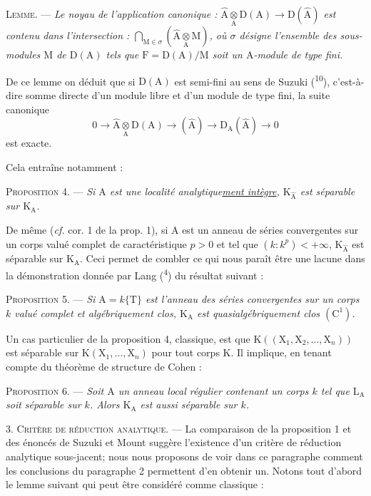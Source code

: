 \textsc{Lemme.} --- \textit{Le noyau de l’application canonique : $\widehat{\mathrm A}\underset{\mathrm A}{\otimes}\mathrm D(\mathrm A)\to\mathrm D(\widehat{\mathrm A})$ est contenu dans l’intersection : $\displaystyle\bigcap_{\mathrm M\in\sigma}\left(\widehat{\mathrm A}\underset{\mathrm A}{\otimes}\mathrm M\right)$, où $\sigma$ désigne l’ensemble des sous-modules $\mathrm M$ de $\mathrm D(\mathrm A)$ tels que $\mathrm F=\mathrm D(\mathrm A)/\mathrm M$ soit un $\mathrm A$-module de type fini.}

De ce lemme on déduit que si $\mathrm D(\mathrm A)$ est semi-fini au sens de Suzuki (\textsuperscript{10}), c’est-à-dire somme directe d’un module libre et d’un module de type fini, la suite canonique
\[
0\to\widehat{\mathrm A}\underset{\mathrm A}{\otimes}\mathrm D(\mathrm A)\to(\widehat{\mathrm A})\to\mathrm D_{\mathrm A}(\widehat{\mathrm A})\to0
\]
est exacte.

Cela entraîne notamment :

\textsc{Proposition 4.} --- \textit{Si $\mathrm A$ est une localité analytique\uline{ment intègre}, $\mathrm K_{\widehat{\mathrm A}}$ est séparable sur $\mathrm K_{\mathrm A}$.}

De même (\textit{cf.} cor. 1 de la prop. 1), si $\mathrm A$ est un anneau de séries convergentes sur un corps valué complet de caractéristique $p>0$ et tel que $(k:k^p)<+\infty$, $\mathrm K_{\widehat{\mathrm A}}$ est séparable sur $\mathrm K_{\mathrm A}$. Ceci permet de combler ce qui nous paraît être une lacune dans la démonstration donnée par Lang (\textsuperscript{4}) du résultat suivant :
\margin{\handwritten{$\left.\rule{0pt}{8em}\right]$ connu}}

\textsc{Proposition 5.} --- \textit{Si $\mathrm A=k\{\mathrm T\}$ est l’anneau des séries convergentes sur un corps $k$ valué complet et algébriquement clos, $\mathrm K_{\mathrm A}$ est quasialgébriquement clos $(\mathrm C^1)$.}

Un cas particulier de la proposition 4, classique, est que $\mathrm K((\mathrm X_1,\mathrm X_2,\ldots,\mathrm X_n))$ est séparable sur $\mathrm K(\mathrm X_1,\ldots,\mathrm X_n)$ pour tout corps $\mathrm K$. Il implique, en tenant compte du théorème de structure de Cohen :

\textsc{Proposition 6.} --- \textit{Soit $\mathrm A$ un anneau local régulier contenant un corps $k$ tel que $\mathrm L_{\mathrm A}$ soit séparable sur $k$. Alors $\mathrm K_{\mathrm A}$ est aussi séparable sur $k$.}

3. \textsc{Critère de réduction analytique.} --- La comparaison de la proposition 1 et des énoncés de Suzuki et Mount suggère l’existence d’un critère de réduction analytique sous-jacent; nous nous proposons de voir dans ce paragraphe comment les conclusions du paragraphe 2 permettent d’en obtenir un. Notons tout d’abord le lemme suivant qui peut être considéré comme classique :

